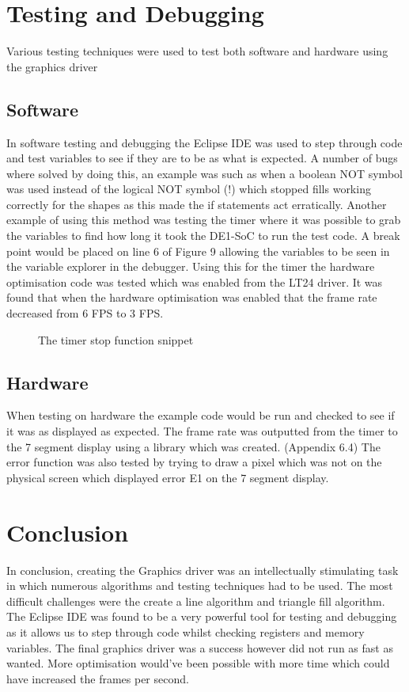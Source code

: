 \documentclass[a4paper,12pt]{article}
\newcommand{\TimerC}{../Timer/Timer.c}
\begin{document}
\section{Testing and Debugging}
\begin{flushleft}
Various testing techniques were used to test both software and hardware using the graphics driver
\end{flushleft}
\subsection{Software}
In software testing and debugging the Eclipse IDE was used to step through code and test variables to see if they are to be as what is expected. A number of bugs where solved by doing this, an example was such as when a boolean NOT symbol was used instead of the logical NOT symbol (!) which stopped fills working correctly for the shapes as this made the if statements act erratically. \newline \newline Another example of using this method was testing the timer where it was possible to grab the variables to find how long it took the DE1-SoC to run the test code. A break point would be placed on line 6 of Figure 9 allowing the variables to be seen in the variable explorer in the debugger. Using this for the timer the hardware optimisation code was tested which was enabled from the LT24 driver. It was found that when the hardware optimisation was enabled that the frame rate decreased from 6 FPS to 3 FPS.
\begin{figure}[h]
	\centering
	\setlength{\belowcaptionskip}{-15pt}
	
	\caption{The timer stop function snippet}
\end{figure}

\subsection{Hardware}
When testing on hardware the example code would be run and checked to see if it was as displayed as expected. The frame rate was outputted from the timer to the 7 segment display using a library which was created. (Appendix 6.4) The error function was also tested by trying to draw a pixel which was not on the physical screen which displayed error E1 on the 7 segment display.
\section{Conclusion}
\begin{flushleft}
In conclusion, creating the Graphics driver was an intellectually stimulating task in which numerous algorithms and testing techniques had to be used. The most difficult challenges were the create a line algorithm and triangle fill algorithm. The Eclipse IDE was found to be a very powerful tool for testing and debugging as it allows us to step through code whilst checking registers and memory variables. The final graphics driver was a success however did not run as fast as wanted. More optimisation would've been possible with more time which could have increased the frames per second. 
\end{flushleft}
\newpage
\end{document}
